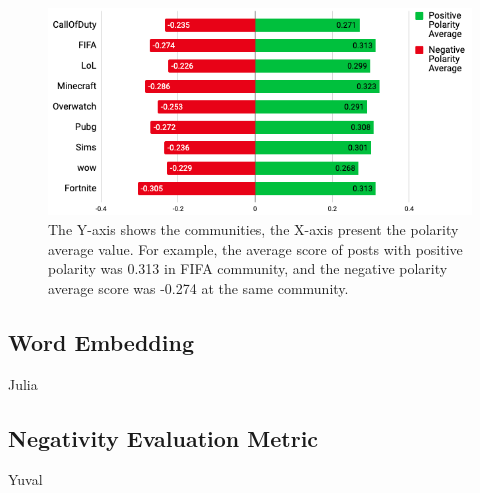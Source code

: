 \begin{figure}[h]
    \begin{center}
        \includegraphics[scale=0.32]{Images/PolarityAverage.png}
    \end{center}
    \caption{The Y-axis shows the communities, the X-axis present the polarity average value. For example, the average score of posts with positive polarity was 0.313 in FIFA community, and the negative polarity average score was -0.274 at the same community.}
    \label{fig:PolarityAverage}
\end{figure}

\subsection{Word Embedding}
Julia
\subsection{Negativity Evaluation Metric}
Yuval


